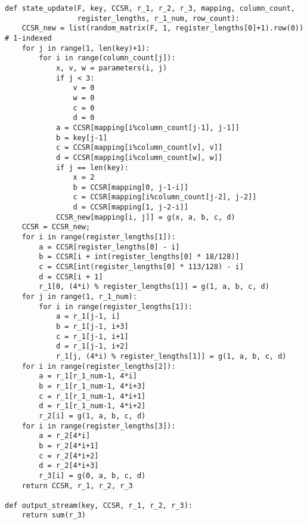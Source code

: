 \documentclass[a4paper,10pt]{article}
\begin{document}
\begin{verbatim}
def state_update(F, key, CCSR, r_1, r_2, r_3, mapping, column_count, 
                 register_lengths, r_1_num, row_count):
    CCSR_new = list(random_matrix(F, 1, register_lengths[0]+1).row(0))    # 1-indexed
    for j in range(1, len(key)+1):
        for i in range(column_count[j]):
            x, v, w = parameters(i, j)
            if j < 3:
                v = 0
                w = 0
                c = 0
                d = 0
            a = CCSR[mapping[i%column_count[j-1], j-1]]
            b = key[j-1]
            c = CCSR[mapping[i%column_count[v], v]]
            d = CCSR[mapping[i%column_count[w], w]]
            if j == len(key):
                x = 2
                b = CCSR[mapping[0, j-1-i]]
                c = CCSR[mapping[i%column_count[j-2], j-2]]
                d = CCSR[mapping[1, j-2-i]]
            CCSR_new[mapping[i, j]] = g(x, a, b, c, d)
    CCSR = CCSR_new;
    for i in range(register_lengths[1]):
        a = CCSR[register_lengths[0] - i]
        b = CCSR[i + int(register_lengths[0] * 18/128)]
        c = CCSR[int(register_lengths[0] * 113/128) - i]
        d = CCSR[i + 1]
        r_1[0, (4*i) % register_lengths[1]] = g(1, a, b, c, d)
    for j in range(1, r_1_num):
        for i in range(register_lengths[1]):
            a = r_1[j-1, i]
            b = r_1[j-1, i+3]
            c = r_1[j-1, i+1]
            d = r_1[j-1, i+2]
            r_1[j, (4*i) % register_lengths[1]] = g(1, a, b, c, d)
    for i in range(register_lengths[2]):
        a = r_1[r_1_num-1, 4*i]
        b = r_1[r_1_num-1, 4*i+3]
        c = r_1[r_1_num-1, 4*i+1]
        d = r_1[r_1_num-1, 4*i+2]
        r_2[i] = g(1, a, b, c, d)
    for i in range(register_lengths[3]):
        a = r_2[4*i]
        b = r_2[4*i+1]
        c = r_2[4*i+2]
        d = r_2[4*i+3]
        r_3[i] = g(0, a, b, c, d)
    return CCSR, r_1, r_2, r_3

def output_stream(key, CCSR, r_1, r_2, r_3):
    return sum(r_3)


\end{verbatim}
\end{document}
